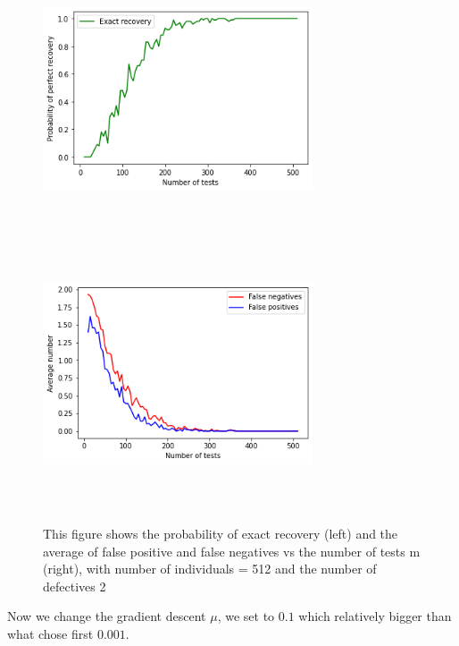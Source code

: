 \begin{figure}[H]
	\includegraphics[height=8cm, width=8cm]{images/512ex}
	\includegraphics[height=8cm, width=8cm]{images/512fal}
	\caption{This figure shows the probability of exact recovery (left) and  the average of false positive and false negatives vs the number of tests m (right), with number of individuals  = 512 and the number of defectives 2}
	\label{exat1}
\end{figure}

Now we change the gradient descent $ \mu $, we set to $ 0.1 $ which relatively bigger than what chose first $ 0.001 $.

